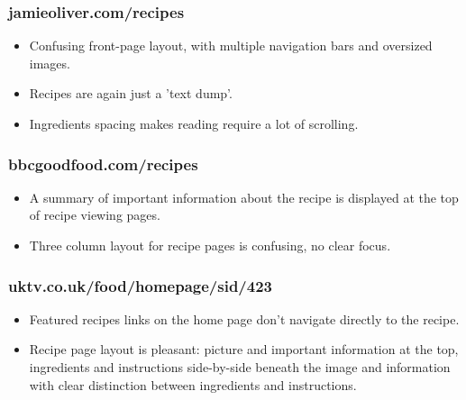 \documentclass{article}
\begin{document}
\subsubsection{jamieoliver.com/recipes}
\begin{itemize}
\item Confusing front-page layout, with multiple navigation bars and oversized images.
\item Recipes are again just a 'text dump'.
\item Ingredients spacing makes reading require a lot of scrolling.
\end{itemize}

\subsubsection{bbcgoodfood.com/recipes}
\begin{itemize}
\item A summary of important information about the recipe is displayed at the top of recipe viewing pages.
\item Three column layout for recipe pages is confusing, no clear focus.
\end{itemize}

\subsubsection{uktv.co.uk/food/homepage/sid/423}
\begin{itemize}
\item Featured recipes links on the home page don't navigate directly to the recipe.
\item Recipe page layout is pleasant: picture and important information at the top, ingredients and instructions side-by-side beneath the image and information with clear distinction between ingredients and instructions.
\end{itemize}

\clearpage
\end{document}
